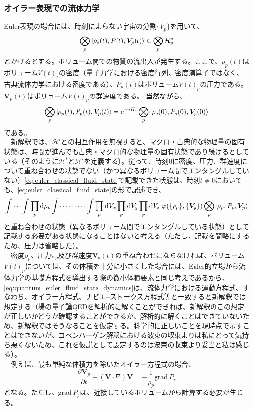 \subsubsection{オイラー表現での流体力学}
Euler表現の場合には、時刻によらない宇宙の分割$\{V_p\}$を用いて、
\begin{equation}
    \label{eq:euler_classical_fluid_state}
    \bigotimes_p \ket{\rho_p(t),P(t),\bm{V}_p(t)} \in \bigotimes_p \mathcal{H}_p^a
\end{equation}
とかけるとする。ボリューム間での物質の流出入が発生する。ここで、$\rho_p(t)$はボリューム$V(t)_p$の密度（量子力学における密度行列、密度演算子ではなく、古典流体力学における密度である）、$P_p(t)$はボリューム$V(t)_p$の圧力である。$\bm{V}_p(t)$はボリューム$V(t)_p$の群速度である。
当然ながら、
\begin{equation}
    \label{eq:quantum_euler_fluid_state_dynamics}
    \bigotimes_p \ket{\rho_p(t),P_p(t),\bm{V}_p(t)} = e^{-iHt}\bigotimes_p \ket{\rho_p(0),P_p(0),\bm{V}_p(0)}
\end{equation}
である。\\
　新解釈では、$\mathcal{H}^i$との相互作用を無視すると、マクロ・古典的な物理量の固有状態は、時間が進んでも古典・マクロ的な物理量の固有状態であり続けるとしている（そのように$\mathcal{H}^t$と$\mathcal{H}^i$を定義する）。従って、時刻$0$に密度、圧力、群速度について重ね合わせの状態でない（かつ異なるボリューム間でエンタングルしていない）\eqref{eq:euler_classical_fluid_state}で記載できた状態は、時刻$t \neq 0$においても、\eqref{eq:euler_classical_fluid_state}の形で記述でき、
\begin{equation}
   \int \cdots \int \prod_p \mathrm{d}\rho_p
   \int \cdots \cdots \cdots \int \prod_p \mathrm{d}V_x \prod_p \mathrm{d}V_y \prod_p \mathrm{d}V_z \; \varphi(\{\rho_p\},\{\bm{V}_p\}) \bigotimes_p \ket{\rho_p,P_p,\bm{V}_p}
\end{equation}
と重ね合わせの状態（異なるボリューム間でエンタングルしている状態）として記載する必要がある状態になることはないと考える（ただし、記載を簡略にするため、圧力は省略した）。\\
　密度$\rho_p$、圧力$\pi_p$及び群速度$\bm{V}_p(t)$の重ね合わせにならなければ、ボリューム$V(t)_p$については、その体積を十分に小さくした場合には、Euler的立場から流体力学の基礎方程式を導出する際の微小体積要素と同じ考えであるから、\eqref{eq:quantum_euler_fluid_state_dynamics}は、流体力学における運動方程式、すなわち、オイラー方程式、ナビエ–ストークス方程式等と一致すると新解釈では想定する（場の量子論QEDを解析的に解くことができれば、新解釈のこの想定が正しいかどうか確認することができるが、解析的に解くことはできていないため、新解釈ではそうなることを仮定する。科学的に正しいことを現時点で示すことはできないが、コペンハーゲン解釈における波束の収束よりは私にとって気持ち悪くないため、これを仮説として設定するのは波束の収束より妥当と私は感じる）。\\
　例えば、最も単純な体積力を除いたオイラー方程式の場合、
\begin{equation}
    \frac{\partial{\bm{V}_p}}{\partial t} + (\bm{V}\cdot \nabla) \bm{V} = -\frac{1}{\rho_p } \mathrm{grad}\, P_p
\end{equation}
となる。ただし、$\mathrm{grad}\,P_p$は、近接しているボリュームから計算する必要が生じる。